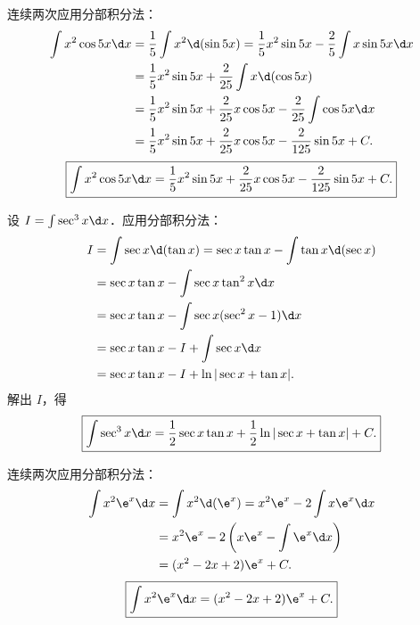\begin{solution}
    连续两次应用分部积分法：
    \begin{equation}
        \begin{aligned}
            \int x^2 \cos 5x \d x & = \frac{1}{5}\int x^2 \d(\sin 5x) = \frac{1}{5}x^2 \sin 5x - \frac{2}{5}\int x \sin 5x \d x \\
                                  & = \frac{1}{5}x^2 \sin 5x + \frac{2}{25}\int x \d(\cos 5x)                                   \\
                                  & = \frac{1}{5}x^2 \sin 5x + \frac{2}{25}x \cos 5x - \frac{2}{25}\int \cos 5x \d x            \\
                                  & = \frac{1}{5}x^2 \sin 5x + \frac{2}{25}x \cos 5x - \frac{2}{125}\sin 5x + C.
        \end{aligned}
    \end{equation}
    \begin{equation}
        \boxed{\int x^2 \cos 5x \d x = \frac{1}{5}x^2 \sin 5x + \frac{2}{25}x \cos 5x - \frac{2}{125}\sin 5x + C.}
    \end{equation}


    设 $I = \int \sec^3 x \d x$．应用分部积分法：
    \begin{equation}
        \begin{aligned}
            I & = \int \sec x \d(\tan x) = \sec x \tan x - \int \tan x \d(\sec x) \\
              & = \sec x \tan x - \int \sec x \tan^2 x \d x                       \\
              & = \sec x \tan x - \int \sec x (\sec^2 x - 1) \d x                 \\
              & = \sec x \tan x - I + \int \sec x \d x                            \\
              & = \sec x \tan x - I + \ln|\sec x + \tan x|.
        \end{aligned}
    \end{equation}
    解出 $I$，得
    \begin{equation}
        \boxed{\int \sec^3 x \d x = \frac{1}{2}\sec x \tan x + \frac{1}{2}\ln|\sec x + \tan x| + C.}
    \end{equation}


    连续两次应用分部积分法：
    \begin{equation}
        \begin{aligned}
            \int x^2 \e^x \d x & = \int x^2 \d(\e^x) = x^2 \e^x - 2\int x \e^x \d x  \\
                               & = x^2 \e^x - 2\left( x\e^x - \int \e^x \d x \right) \\
                               & = (x^2 - 2x + 2)\e^x + C.
        \end{aligned}
    \end{equation}
    \begin{equation}
        \boxed{\int x^2 \e^x \d x = (x^2 - 2x + 2)\e^x + C.}
    \end{equation}


\end{solution}
